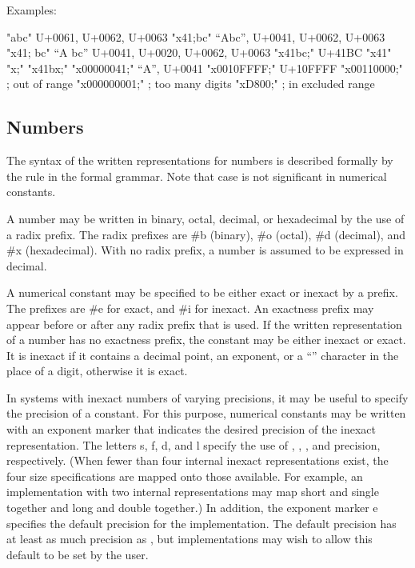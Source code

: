 Examples:

\begin{schemenoindent}
"abc" \ev  \textrm{U+0061, U+0062, U+0063}
"\backwhack{}x41;bc" \ev  \textrm{``Abc'', U+0041, U+0062, U+0063}
"\backwhack{}x41; bc" \ev  \textrm{``A bc''}
\>\>\textrm{U+0041, U+0020, U+0062, U+0063}
"\backwhack{}x41bc;" \ev  \textrm{U+41BC}
"\backwhack{}x41" \ev {}
"\backwhack{}x;" \ev {}
"\backwhack{}x41bx;" \ev {}
"\backwhack{}x00000041;" \ev  \textrm{``A'', U+0041}
"\backwhack{}x0010FFFF;" \ev \textrm{U+10FFFF}
"\backwhack{}x00110000;" \ev  {}
\>\>; \textrm{out of range}
"\backwhack{}x000000001;" \ev {}
\>\>; \textrm{too many digits}
"\backwhack{}xD800;" \ev {}
\>\>; \textrm{in excluded range}
\end{schemenoindent}
  
\subsection{Numbers}
\label{numbernotations}

The syntax of the written representations for numbers is described
formally by the  rule in the formal grammar.  Note that
case is not significant in numerical constants.

A number may be written in binary, octal, decimal, or
hexadecimal by the use of a radix prefix.  The radix prefixes are {\cf
\#b} (binary), {\cf \#o} (octal), {\cf
\#d} (decimal), and {\cf \#x} (hexadecimal).  With
no radix prefix, a number is assumed to be expressed in decimal.

A
numerical constant may be specified to be either exact or
inexact by a prefix.  The prefixes are {\cf \#e}
for exact, and {\cf \#i} for inexact.  An exactness
prefix may appear before or after any radix prefix that is used.  If
the written representation of a number has no exactness prefix, the
constant may be either inexact or exact.  It is
inexact if it contains a decimal point, an
exponent, or a ``\sharpsign'' character in the place of a digit,
otherwise it is exact.

In systems with inexact numbers
of varying precisions, it may be useful to specify
the precision of a constant.  For this purpose, numerical constants
may be written with an exponent marker that indicates the
desired precision of the inexact
representation.  The letters {\cf s}, {\cf f},
{\cf d}, and {\cf l} specify the use of , ,
, and  precision, respectively.  (When fewer
than four internal
inexact
representations exist, the four size
specifications are mapped onto those available.  For example, an
implementation with two internal representations may map short and
single together and long and double together.)  In addition, the
exponent marker {\cf e} specifies the default precision for the
implementation.  The default precision has at least as much precision
as , but
implementations may wish to allow this default to be set by the user.

